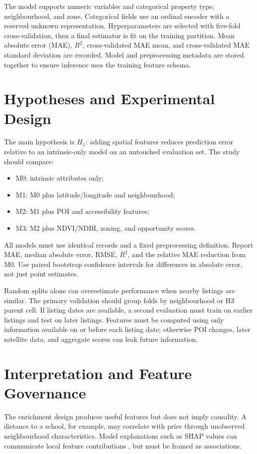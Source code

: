 \documentclass[conference]{IEEEtran}
\begin{document}
The model supports numeric variables and categorical property type, neighbourhood, and zone. Categorical fields use an ordinal encoder with a reserved unknown representation. Hyperparameters are selected with five-fold cross-validation, then a final estimator is fit on the training partition. Mean absolute error (MAE), $R^2$, cross-validated MAE mean, and cross-validated MAE standard deviation are recorded. Model and preprocessing metadata are stored together to ensure inference uses the training feature schema.

\section{Hypotheses and Experimental Design}
The main hypothesis is $H_1$: adding spatial features reduces prediction error relative to an intrinsic-only model on an untouched evaluation set. The study should compare:
\begin{itemize}
\item M0: intrinsic attributes only;
\item M1: M0 plus latitude/longitude and neighbourhood;
\item M2: M1 plus POI and accessibility features;
\item M3: M2 plus NDVI/NDBI, zoning, and opportunity scores.
\end{itemize}
All models must use identical records and a fixed preprocessing definition. Report MAE, median absolute error, RMSE, $R^2$, and the relative MAE reduction from M0. Use paired bootstrap confidence intervals for differences in absolute error, not just point estimates.

Random splits alone can overestimate performance when nearby listings are similar. The primary validation should group folds by neighbourhood or H3 parent cell. If listing dates are available, a second evaluation must train on earlier listings and test on later listings. Features must be computed using only information available on or before each listing date; otherwise POI changes, later satellite data, and aggregate scores can leak future information.

\section{Interpretation and Feature Governance}
The enrichment design produces useful features but does not imply causality. A distance to a school, for example, may correlate with price through unobserved neighbourhood characteristics. Model explanations such as SHAP values can communicate local feature contributions \cite{lundberg2017shap}, but must be framed as associations.
\end{document}

